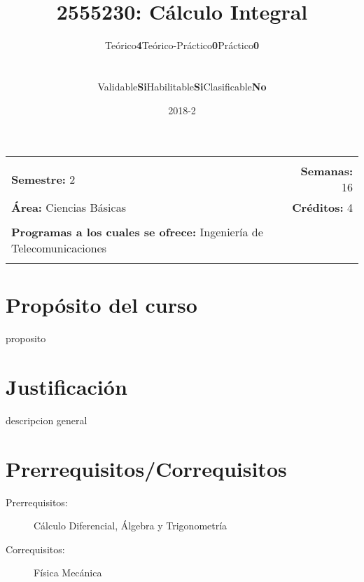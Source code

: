\documentclass[11pt]{article}
\title{2555230: Cálculo Integral}
\author{\begin{tabular} {c|c|c|c|c|c} Teórico & \textbf{4} & Teórico-Práctico & \textbf{0} & Práctico & \textbf{0}\end{tabular}
\\
\begin{tabular} {c|c|c|c|c|c} Validable & \textbf{Si} & Habilitable & \textbf{Si} & Clasificable & \textbf{No}\end{tabular}}
\date{2018-2}
\newcommand{\blankline}{\quad\pagebreak[2]}
\begin{document}
\maketitle

\begin{tabular*}{.93\textwidth}{@{\extracolsep{\fill}}lr}
\hline\\

\textbf{Semestre:} 2 & \textbf{Semanas:} 16
\\
\textbf{Área:} Ciencias Básicas &    \textbf{Créditos:} 4 
\\ & \\
\textbf{Programas a los cuales se ofrece:} Ingeniería de Telecomunicaciones
\\ & \\
\hline
\end{tabular*}

\vspace{5 mm}

\section*{Propósito del curso}

proposito



\section*{Justificación}

descripcion general

\section*{Prerrequisitos/Correquisitos}
\begin{description}
\item [Prerrequisitos:] Cálculo Diferencial, Álgebra y Trigonometría
\item[Correquisitos:] Física Mecánica
\end{description}
\end{document}
